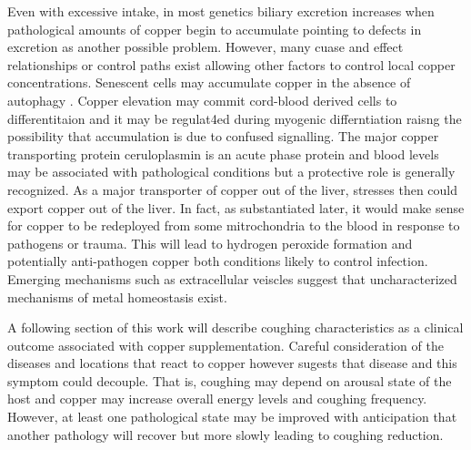\documentclass[aps,secnumarabic,balancelastpage,amsmath,amssymb,nofootinbib]{revtex4}
\newcommand{\mjmtolx}[1]{}
\begin{document}
Even with excessive intake, in most genetics
 biliary excretion increases when pathological
amounts of copper begin to accumulate
\cite{Chen_Min_Wang_Copper_homeostasis_cuproptosis_2022}
\cite{Hamza_Gitlin_Hepatic_Copper_Transport_2013} pointing
to defects in excretion as another possible problem.
However, many cuase and effect relationships or
control paths exist allowing other factors to control
local copper concentrations.  
Senescent cells may accumulate copper in the absence
of autophagy
\cite{Masaldan_Clatworthy_Gamell_Copper_accumulation_senescent_2018}.
Copper elevation may commit 
cord-blood derived cells  to differentitaion \cite{PMID11849228}
and it may be regulat4ed during myogenic differntiation
\cite{PMC5824686} raisng the possibility that accumulation
is due to confused signalling. 
The major copper transporting protein ceruloplasmin is an 
acute phase protein 
and blood levels may be associated with pathological conditions
\cite{PMID15668644} but a protective role is generally recognized.
As a major transporter of copper out of the liver, 
stresses then could export copper  out of the  liver.
In fact, as substantiated later, it would make sense
for copper to be redeployed from some mitrochondria to the blood
in response to pathogens or trauma. This will lead to hydrogen
peroxide formation and potentially anti-pathogen copper both conditions
likely to control infection. 
Emerging mechanisms such as extracellular veiscles 
\cite{Bellingham_Guo_Hill_secret_life_2015} suggest
that uncharacterized mechanisms of metal homeostasis
exist.


\mjmtolx{
Other dietary components can impact uptake, signalling,  and 
distribution in many ways. 
The dietary and genetic factors that influence copper 
distribution  and health outcomes are complex and probably not fully known. 
While genetics are highly variable in dogs, some other factors
include many dietary components, GI health,  and signalling stimuli. 

}

A following section of this work will describe coughing characteristics
as a clinical outcome associated with copper supplementation.
Careful consideration of the diseases and locations that react
to copper however sugests that disease and this symptom
could decouple. That is, coughing may depend on arousal state
of the host and copper may increase overall energy levels and
coughing frequency.  However, at least one pathological state
may be improved with anticipation that another pathology will
recover but more slowly leading to coughing reduction. 
\end{document}
